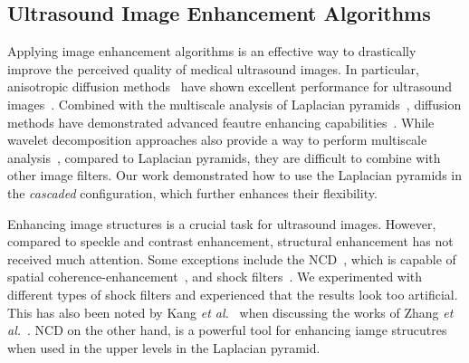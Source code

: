 





\subsection{Ultrasound Image Enhancement Algorithms}
Applying image enhancement algorithms is an effective way to drastically improve the perceived quality of medical ultrasound images.
In particular, anisotropic diffusion methods~\cite{perona_scalespace_1990, weickert_anisotropic_1998} have shown excellent performance for ultrasound images~\cite{yongjianyu_speckle_2002, abd-elmoniem_realtime_2002, aja-fernandez_estimation_2006, krissian_oriented_2007, vegas-sanchez-ferrero_probabilisticdriven_2010, ramos-llorden_anisotropic_2015, mishra_edge_2018}.
Combined with the multiscale analysis of Laplacian pyramids~\cite{burt_laplacian_1983}, diffusion methods have demonstrated advanced feautre enhancing capabilities~\cite{zhang_multiscale_2006, zhang_nonlinear_2007, kang_new_2016}.
While wavelet decomposition approaches also provide a way to perform multiscale analysis~\cite{xulizong_speckle_1998, xiaohuihao_novel_1999, pizurica_versatile_2003, yongyue_nonlinear_2006}, compared to Laplacian pyramids, they are difficult to combine with other image filters.
Our work demonstrated how to use the Laplacian pyramids in the \textit{cascaded} configuration, which further enhances their flexibility.

Enhancing image structures is a crucial task for ultrasound images.
However, compared to speckle and contrast enhancement, structural enhancement has not received much attention.
Some exceptions include the NCD~\cite{abd-elmoniem_realtime_2002}, which is capable of spatial coherence-enhancement~\cite{weickert_coherenceenhancing_1999}, and shock filters~\cite{zhang_multiscale_2006, kang_new_2016}.
We experimented with different types of shock filters and experienced that the results look too artificial.
This has also been noted by Kang \textit{et al.}~\cite{kang_new_2016} when discussing the works of Zhang \textit{et al.}~\cite{zhang_multiscale_2006}.
NCD on the other hand, is a powerful tool for enhancing iamge strucutres when used in the upper levels in the Laplacian pyramid.

